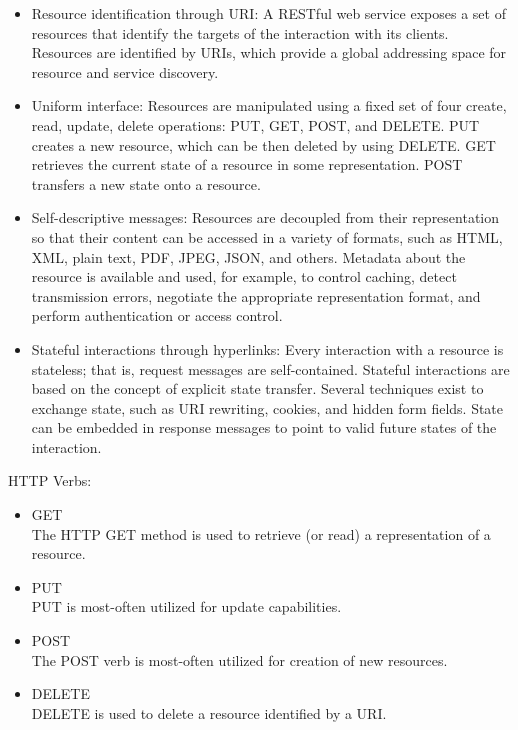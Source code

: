 \documentclass[12pt]{article}
\begin{document}
\begin{itemize}
\item Resource identification through URI: 
A RESTful web service exposes a set of resources that identify the targets of the interaction with its clients. Resources are identified by URIs, which provide a global addressing space for resource and service discovery.\\
\item Uniform interface: 
Resources are manipulated using a fixed set of four create, read, update, delete operations: PUT, GET, POST, and DELETE. PUT creates a new resource, which can be then deleted by using DELETE. GET retrieves the current state of a resource in some representation. POST transfers a new state onto a resource.\\
\item Self-descriptive messages: 
Resources are decoupled from their representation so that their content can be accessed in a variety of formats, such as HTML, XML, plain text, PDF, JPEG, JSON, and others. Metadata about the resource is available and used, for example, to control caching, detect transmission errors, negotiate the appropriate representation format, and perform authentication or access control. \\
\item Stateful interactions through hyperlinks:
Every interaction with a resource is stateless; that is, request messages are self-contained. Stateful interactions are based on the concept of explicit state transfer. Several techniques exist to exchange state, such as URI rewriting, cookies, and hidden form fields. State can be embedded in response messages to point to valid future states of the interaction.\\
\end{itemize}
HTTP Verbs:
\begin{itemize}
\item GET\\
The HTTP GET method is used to retrieve (or read) a representation of a resource.
\item PUT\\
PUT is most-often utilized for update capabilities.
\item POST\\
The POST verb is most-often utilized for creation of new resources.
\item DELETE\\
DELETE is used to delete a resource identified by a URI.
\end{itemize}
\cite{RESTful}
\end{document}
